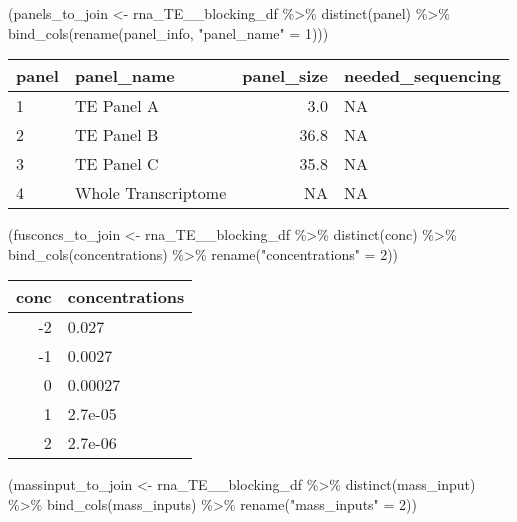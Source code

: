 \documentclass[
]{article}
\newenvironment{Shaded}{\begin{snugshade}}{\end{snugshade}}
\newcommand{\DecValTok}[1]{\textcolor[rgb]{0.00,0.00,0.81}{#1}}
\newcommand{\FunctionTok}[1]{\textcolor[rgb]{0.00,0.00,0.00}{#1}}
\newcommand{\NormalTok}[1]{#1}
\newcommand{\OtherTok}[1]{\textcolor[rgb]{0.56,0.35,0.01}{#1}}
\newcommand{\SpecialCharTok}[1]{\textcolor[rgb]{0.00,0.00,0.00}{#1}}
\newcommand{\StringTok}[1]{\textcolor[rgb]{0.31,0.60,0.02}{#1}}
\begin{document}
\begin{Shaded}
\begin{Highlighting}[]
\NormalTok{(panels\_to\_join }\OtherTok{\textless{}{-}}\NormalTok{ rna\_TE\_\_blocking\_df }\SpecialCharTok{\%\textgreater{}\%}
  \FunctionTok{distinct}\NormalTok{(panel) }\SpecialCharTok{\%\textgreater{}\%}
   \FunctionTok{bind\_cols}\NormalTok{(}\FunctionTok{rename}\NormalTok{(panel\_info, }\StringTok{"panel\_name"} \OtherTok{=} \DecValTok{1}\NormalTok{)))}
\end{Highlighting}
\end{Shaded}

\begin{longtable}[]{@{}llrl@{}}
\toprule()
panel & panel\_name & panel\_size & needed\_sequencing \\
\midrule()
\endhead
1 & TE Panel A & 3.0 & NA \\
2 & TE Panel B & 36.8 & NA \\
3 & TE Panel C & 35.8 & NA \\
4 & Whole Transcriptome & NA & NA \\
\bottomrule()
\end{longtable}

\begin{Shaded}
\begin{Highlighting}[]
\NormalTok{(fusconcs\_to\_join }\OtherTok{\textless{}{-}}\NormalTok{ rna\_TE\_\_blocking\_df }\SpecialCharTok{\%\textgreater{}\%}
  \FunctionTok{distinct}\NormalTok{(conc) }\SpecialCharTok{\%\textgreater{}\%}
  \FunctionTok{bind\_cols}\NormalTok{(concentrations) }\SpecialCharTok{\%\textgreater{}\%}
  \FunctionTok{rename}\NormalTok{(}\StringTok{"concentrations"} \OtherTok{=} \DecValTok{2}\NormalTok{))}
\end{Highlighting}
\end{Shaded}

\begin{longtable}[]{@{}rl@{}}
\toprule()
conc & concentrations \\
\midrule()
\endhead
-2 & 0.027 \\
-1 & 0.0027 \\
0 & 0.00027 \\
1 & 2.7e-05 \\
2 & 2.7e-06 \\
\bottomrule()
\end{longtable}

\begin{Shaded}
\begin{Highlighting}[]
\NormalTok{(massinput\_to\_join }\OtherTok{\textless{}{-}}\NormalTok{ rna\_TE\_\_blocking\_df }\SpecialCharTok{\%\textgreater{}\%}
  \FunctionTok{distinct}\NormalTok{(mass\_input) }\SpecialCharTok{\%\textgreater{}\%}
  \FunctionTok{bind\_cols}\NormalTok{(mass\_inputs) }\SpecialCharTok{\%\textgreater{}\%}
  \FunctionTok{rename}\NormalTok{(}\StringTok{"mass\_inputs"} \OtherTok{=} \DecValTok{2}\NormalTok{))}
\end{Highlighting}
\end{Shaded}
\end{document}

